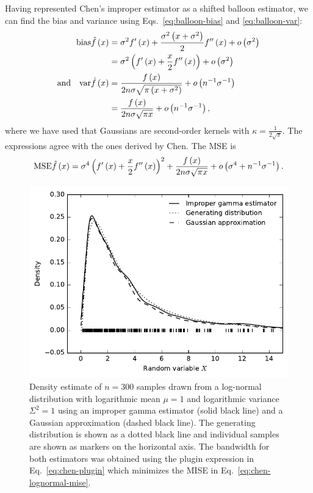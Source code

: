 Having represented Chen's improper estimator as a shifted balloon estimator, we can find the bias and variance using Eqs.~\eqref{eq:balloon-bias} and \eqref{eq:balloon-var}:
\begin{align*}
\mathrm{bias}\hat{f}\left(x\right) & =\sigma^{2}f'\left(x\right)+\frac{\sigma^{2}\left(x+\sigma^{2}\right)}{2}f''\left(x\right)+o\left(\sigma^{2}\right)\\
 & =\sigma^{2}\left(f'\left(x\right)+\frac{x}{2}f''\left(x\right)\right)+o\left(\sigma^{2}\right)\\
\text{and}\quad\mathrm{var}\hat{f}\left(x\right) & =\frac{f\left(x\right)}{2n\sigma\sqrt{\pi\left(x+\sigma^{2}\right)}}+o\left(n^{-1}\sigma^{-1}\right)\\
 & =\frac{f\left(x\right)}{2n\sigma\sqrt{\pi x}}+o\left(n^{-1}\sigma^{-1}\right),
\end{align*}
where we have used that Gaussians are second-order kernels with $\kappa=\frac{1}{2\sqrt{\pi}}$. The expressions agree with the ones derived by Chen. The MSE is
\[
\mathrm{MSE}\hat{f}\left(x\right)=\sigma^{4}\left(f'\left(x\right)+\frac{x}{2}f''\left(x\right)\right)^{2}+\frac{f\left(x\right)}{2n\sigma\sqrt{\pi x}}+o\left(\sigma^{4}+n^{-1}\sigma^{-1}\right).
\]


\begin{figure}
\begin{centering}
\includegraphics{improper-gamma}
\par\end{centering}

\caption{\label{fig:improper-gamma}Density estimate of $n=300$ samples drawn from a log-normal distribution with logarithmic mean $\mu=1$ and logarithmic variance $\Sigma^{2}=1$ using an improper gamma estimator (solid black line) and a Gaussian approximation (dashed black line). The generating distribution is shown as a dotted black line and individual samples are shown as markers on the horizontal axis. The bandwidth for both estimators was obtained using the plugin expression in Eq.~\eqref{eq:chen-plugin} which minimizes the MISE in Eq.~\eqref{eq:chen-lognormal-mise}.}
\end{figure}


